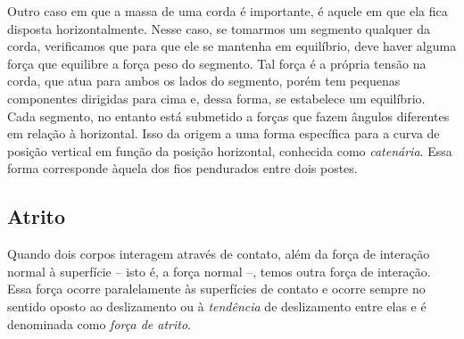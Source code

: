 Outro caso em que a massa de uma corda é importante, é aquele em que ela fica disposta horizontalmente. Nesse caso, se tomarmos um segmento qualquer da corda, verificamos que para que ele se mantenha em equilíbrio, deve haver alguma força que equilibre a força peso do segmento. Tal força é a própria tensão na corda, que atua para ambos os lados do segmento, porém tem pequenas componentes dirigidas para cima e, dessa forma, se estabelece um equilíbrio. Cada segmento, no entanto está submetido a forças que fazem ângulos diferentes em relação à horizontal. Isso da origem a uma forma específica para a curva de posição vertical em função da posição horizontal, conhecida como \emph{catenária}. Essa forma corresponde àquela dos fios pendurados entre dois postes. 

\subsection{Atrito}

Quando dois corpos interagem através de contato, além da força de interação normal à superfície -- isto é, a força normal --, temos outra força de interação. Essa força ocorre paralelamente às superfícies de contato e ocorre sempre no sentido oposto ao deslizamento ou à \emph{tendência} de deslizamento entre elas e é denominada como \emph{força de atrito}.

